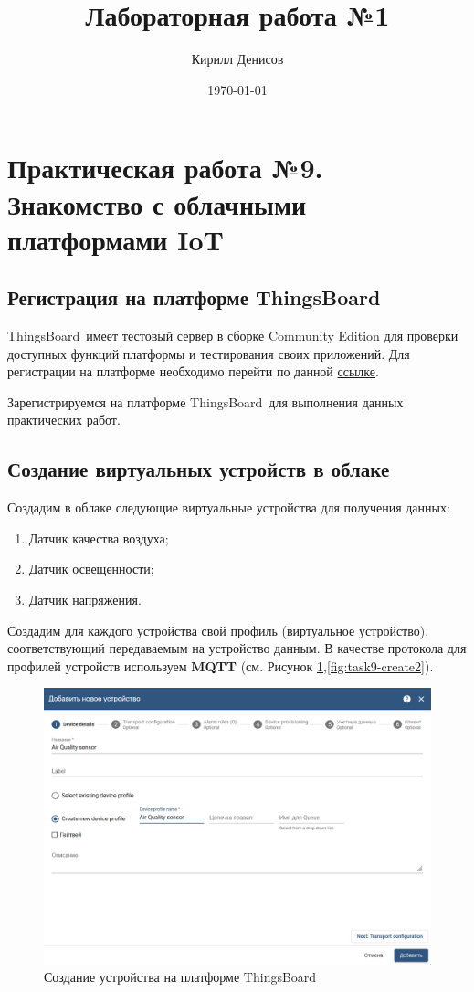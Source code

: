 \documentclass[utf8x]{G7-32} %
\author{Кирилл Денисов}
\title{Лабораторная работа №1}
\date{\today}
\newcommand{\pathToCommonFolder}{/home/denilai/Documents/repos/latex/Common}
\newcommand{\tb}{ThingsBoard~}
\begin{document}
	\thispagestyle{empty}
	
	\newpage
	\tableofcontents
	\newpage

\normalsize

\section{Практическая работа №9.\\Знакомство с облачными платформами IoT}
\subsection{Регистрация на платформе \tb}

\tb имеет тестовый сервер в сборке Community Edition для проверки доступных
функций платформы и тестирования своих приложений. Для регистрации на платформе
необходимо перейти по данной  \href{https://demo.\tb.io/signup}{ссылке}.

Зарегистрируемся на платформе \tb для выполнения данных практических работ.

\subsection{Создание виртуальных устройств в облаке}

Создадим в облаке следующие виртуальные устройства для получения данных:


\begin{enumerate}
	\item Датчик качества воздуха;
	\item Датчик освещенности;
	\item Датчик напряжения.
\end{enumerate}

Создадим для каждого устройства свой профиль (виртуальное устройство), соответствующий передаваемым на
устройство данным. В качестве протокола для профилей устройств используем \textbf{MQTT} (см. Рисунок \ref{fig:task9-create},\ref{fig:task9-create2}).
\begin{figure}[h!]
	\centering
	\includegraphics[width=0.7\linewidth]{images/task9-create}
	\caption{Создание устройства на платформе \tb}
	\label{fig:task9-create}
\end{figure}
\end{document}
